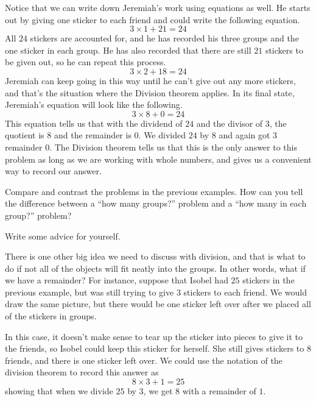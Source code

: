 \documentclass{ximera}
\begin{document}
Notice that we can write down Jeremiah's work using equations as well. He starts out by giving one sticker to each friend and could write the following equation.
\[
3 \times 1 + 21 = 24
\]
All $24$ stickers are accounted for, and he has recorded his three groups and the one sticker in each group. He has also recorded that there are still $21$ stickers to be given out, so he can repeat this process.
\[
3 \times 2 + 18  = 24
\]
Jeremiah can keep going in this way until he can't give out any more stickers, and that's the situation where the Division theorem applies. In its final state, Jeremiah's equation will look like the following.
\[
3 \times 8 + 0 = 24
\]
This equation tells us that with the dividend of  $24$ and the divisor of $3$, the quotient is $8$ and the remainder is $0$. We divided $24$ by $8$ and again got $3$ remainder $0$. The Division theorem tells us that this is the only answer to this problem as long as we are working with whole numbers, and gives us a convenient way to record our answer.

\begin{question}
Compare and contrast the problems in the previous examples. How can you tell the difference between a ``how many groups?'' problem and a ``how many in each group?'' problem?
\begin{freeResponse}
Write some advice for yourself.
\end{freeResponse}
\end{question}


There is one other big idea we need to discuss with division, and that is what to do if not all of the objects will fit neatly into the groups. In other words, what if we have a remainder? For instance, suppose that Isobel had $25$ stickers in the previous example, but was still trying to give $3$ stickers to each friend. We would draw the same picture, but there would be one sticker left over after we placed all of the stickers in groups. 

\begin{image}
\end{image}
In this case, it doesn't make sense to tear up the sticker into pieces to give it to the friends, so Isobel could keep this sticker for herself. She still gives stickers to $8$ friends, and there is one sticker left over. We could use the notation of the division theorem to record this answer as 
\[
8 \times 3 + 1 = 25
\]
showing that when we divide $25$ by $3$, we get $8$ with a remainder of $1$.
\end{document}
